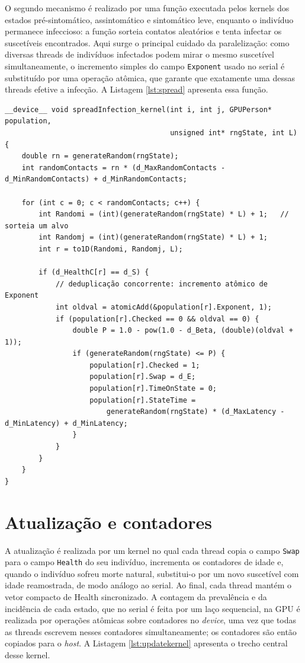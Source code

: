 \documentclass[
	12pt,				%
	openright,			%
	oneside,			%
	a4paper,			%
	english,			%
	french,				%
	spanish,			%
	brazil				%
	]{abntex2}
\begin{document}
O segundo mecanismo é realizado por uma função executada pelos kernels dos estados pré-sintomático, assintomático e sintomático leve, enquanto o indivíduo permanece infeccioso: a função sorteia contatos aleatórios e tenta infectar os suscetíveis encontrados. Aqui surge o principal cuidado da paralelização: como diversas threads de indivíduos infectados podem mirar o mesmo suscetível simultaneamente, o incremento simples do campo \texttt{Exponent} usado no serial é substituído por uma operação atômica, que garante que exatamente uma dessas threads efetive a infecção. A Listagem \ref{lst:spread} apresenta essa função.

\begin{lstlisting}[caption={Segundo mecanismo: deduplicação concorrente por operação atômica.}, label={lst:spread}]
__device__ void spreadInfection_kernel(int i, int j, GPUPerson* population,
                                       unsigned int* rngState, int L) {
    double rn = generateRandom(rngState);
    int randomContacts = rn * (d_MaxRandomContacts - d_MinRandomContacts) + d_MinRandomContacts;

    for (int c = 0; c < randomContacts; c++) {
        int Randomi = (int)(generateRandom(rngState) * L) + 1;   // sorteia um alvo
        int Randomj = (int)(generateRandom(rngState) * L) + 1;
        int r = to1D(Randomi, Randomj, L);

        if (d_HealthC[r] == d_S) {
            // deduplicação concorrente: incremento atômico de Exponent
            int oldval = atomicAdd(&population[r].Exponent, 1);
            if (population[r].Checked == 0 && oldval == 0) {
                double P = 1.0 - pow(1.0 - d_Beta, (double)(oldval + 1));
                if (generateRandom(rngState) <= P) {
                    population[r].Checked = 1;
                    population[r].Swap = d_E;
                    population[r].TimeOnState = 0;
                    population[r].StateTime =
                        generateRandom(rngState) * (d_MaxLatency - d_MinLatency) + d_MinLatency;
                }
            }
        }
    }
}
\end{lstlisting}

\section{Atualização e contadores}

A atualização é realizada por um kernel no qual cada thread copia o campo \texttt{Swap} para o campo \texttt{Health} do seu indivíduo, incrementa os contadores de idade e, quando o indivíduo sofreu morte natural, substitui-o por um novo suscetível com idade reamostrada, de modo análogo ao serial. Ao final, cada thread mantém o vetor compacto de Health sincronizado. A contagem da prevalência e da incidência de cada estado, que no serial é feita por um laço sequencial, na GPU é realizada por operações atômicas sobre contadores no \textit{device}, uma vez que todas as threads escrevem nesses contadores simultaneamente; os contadores são então copiados para o \textit{host}. A Listagem \ref{lst:updatekernel} apresenta o trecho central desse kernel.
\end{document}
